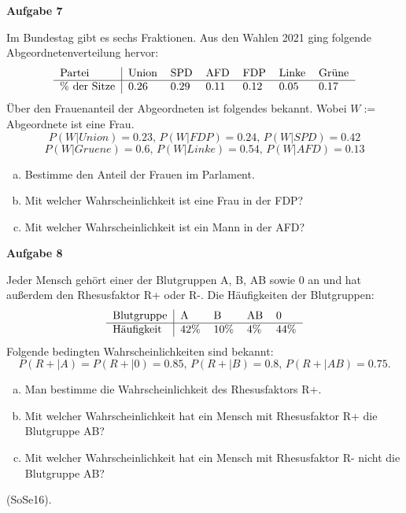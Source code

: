 \documentclass[a4paper,12pt]{article}
\newcommand{\Aufgabe}[1]{
  {
  \vspace*{0.5cm}
  \textsf{\textbf{Aufgabe #1}}
  \vspace*{0.2cm}
  
  }
}
\begin{document}
\Aufgabe{7}
Im Bundestag gibt es sechs Fraktionen. Aus den Wahlen 2021 ging folgende Abgeordnetenverteilung hervor:
$$
\begin{tabular}[h]{l|lllllllllll}
Partei & Union & SPD & AFD & FDP & Linke & Grüne \\
\hline
\% der Sitze & 0.26 & 0.29 & 0.11 & 0.12 & 0.05 & 0.17   \\
\end{tabular}
$$
Über den Frauenanteil der Abgeordneten ist folgendes bekannt. Wobei $W:=$Abgeordnete ist eine Frau.
$$
P(W|Union) =0.23\text{,    }P(W|FDP)=0.24\text{,    }P(W|SPD)=0.42 
$$
$$
P(W|Gruene)=0.6\text{,    }P(W|Linke)=0.54\text{,    }P(W|AFD)=0.13
$$
\begin{enumerate}[a)]
\item Bestimme den Anteil der Frauen im Parlament.
\item Mit welcher Wahrscheinlichkeit ist eine Frau in der FDP?
\item Mit welcher Wahrscheinlichkeit ist ein Mann in der AFD?
\end{enumerate}



\Aufgabe{8}
Jeder Mensch gehört einer der Blutgruppen A, B, AB sowie 0 an und hat außerdem den Rhesusfaktor R+ oder R-. Die Häufigkeiten der Blutgruppen:
$$
\begin{tabular}[h]{l|llllllllll}
Blutgruppe & A & B & AB & 0 \\
\hline
Häufigkeit  & 42\% & 10\% & 4\% & 44\%  \\
\end{tabular}
$$
Folgende bedingten Wahrscheinlichkeiten sind bekannt:
$$
P(R+|A) = P(R+|0)=0.85\text{,    }P(R+|B)=0.8\text{,    }P(R+|AB)=0.75.
$$
\begin{enumerate}[a)]
\item Man bestimme die Wahrscheinlichkeit des Rhesusfaktors R+.
\item Mit welcher Wahrscheinlichkeit hat ein Mensch mit Rhesusfaktor R+ die Blutgruppe AB?
\item Mit welcher Wahrscheinlichkeit hat ein Mensch mit Rhesusfaktor R- nicht die Blutgruppe AB?
\end{enumerate}
 (SoSe16).


\end{document}
